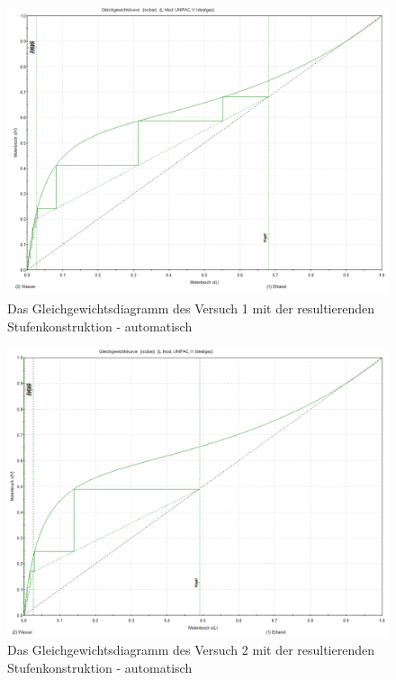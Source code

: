\begin{figure}[h!]
	\centering
	\includegraphics[width=0.85\linewidth]{img/VLE-MC-1}
	\caption{Das Gleichgewichtsdiagramm des Versuch 1 mit der resultierenden Stufenkonstruktion - automatisch}
	\label{fig:versuchsaufbau-ebull}
\end{figure}
\FloatBarrier
\begin{figure}[h!]
	\centering
	\includegraphics[width=0.85\linewidth]{img/VLE-Mc-2}
	\caption{Das Gleichgewichtsdiagramm des Versuch 2 mit der resultierenden Stufenkonstruktion - automatisch}
	\label{fig:versuchsaufbau-ebull}
\end{figure}
\FloatBarrier
